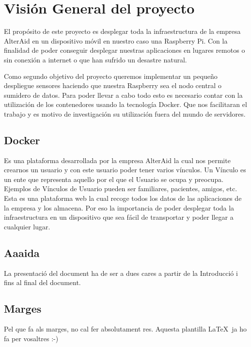 \chapter{Visión General del proyecto}\label{C:Visión General del proyecto}

El propósito de este proyecto es desplegar toda la infraestructura de la empresa AlterAid en un dispositivo móvil en nuestro caso una Raspberry Pi. Con la finalidad de poder conseguir desplegar nuestras aplicaciones en lugares remotos o sin conexión a internet o que han sufrido un desastre natural.

Como segundo objetivo del proyecto queremos implementar un pequeño despliegue sensores haciendo que nuestra Raspberry sea el nodo central o sumidero de datos. 
Para poder llevar a cabo todo esto es necesario contar con la utilización de los contenedores usando la tecnología Docker. Que nos facilitaran el trabajo y es motivo de investigación su utilización fuera del mundo de servidores.

\section{Docker}

Es una plataforma desarrollada por la empresa AlterAid la cual nos permite crearnos un usuario y con este usuario poder tener varios vínculos. Un Vínculo es un ente que representa aquello por el que el Usuario se ocupa y preocupa. Ejemplos de Vínculos de Usuario pueden ser familiares, pacientes, amigos, etc. 
Esta es una plataforma web la cual recoge todos los datos de las aplicaciones de la empresa y los almacena. Por eso la importancia de poder desplegar toda la infraestructura en un dispositivo que sea fácil de transportar y poder llegar a cualquier lugar.

\section{Aaaida}

La presentació del document ha de ser a dues cares a partir de la Introducció i fins al final del document.


\section{Marges}

Pel que fa als marges, no cal fer absolutament res. Aquesta plantilla \LaTeX \ ja ho fa per vosaltres :-)



